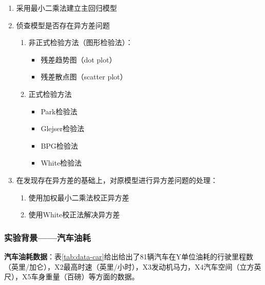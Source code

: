 \documentclass[12pt,(landscape,a4paper),(portrait,a4paper)]{article}
\providecommand{\tightlist}{%
  \setlength{\itemsep}{0pt}\setlength{\parskip}{0pt}}
\begin{document}
\begin{enumerate}
\def\labelenumi{\arabic{enumi}.}
\item
  采用最小二乘法建立主回归模型
\item
  侦查模型是否存在异方差问题

  \begin{enumerate}
  \def\labelenumii{\arabic{enumii})}
  \tightlist
  \item
    非正式检验方法（图形检验法）：

    \begin{itemize}
    \tightlist
    \item
      残差趋势图（dot plot）
    \item
      残差散点图（scatter plot）
    \end{itemize}
  \item
    正式检验方法

    \begin{itemize}
    \tightlist
    \item
      Park检验法
    \item
      Glejser检验法
    \item
      BPG检验法
    \item
      White检验法
    \end{itemize}
  \end{enumerate}
\item
  在发现存在异方差的基础上，对原模型进行异方差问题的处理：

  \begin{enumerate}
  \def\labelenumii{\arabic{enumii})}
  \tightlist
  \item
    使用加权最小二乘法校正异方差\\
  \item
    使用White校正法解决异方差
  \end{enumerate}
\end{enumerate}

\subsubsection{实验背景------汽车油耗}

\textbf{汽车油耗数据}：表\ref{tab:data-car}给出给出了81辆汽车在Y单位油耗的行驶里程数（英里/加仑），X2最高时速（英里/小时），X3发动机马力，X4汽车空间（立方英尺），X5车身重量（百磅）等方面的数据。
\end{document}

